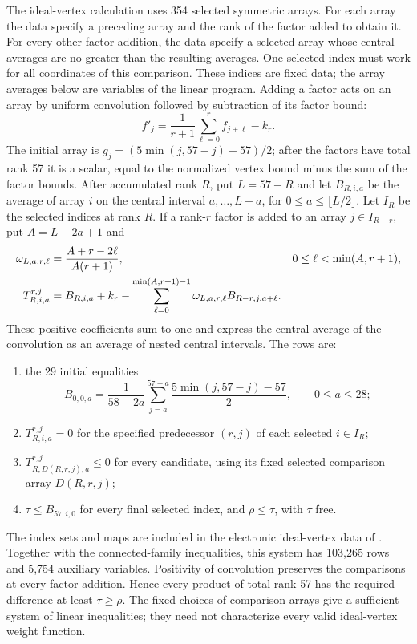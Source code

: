 \documentclass[11pt]{article}
\theoremstyle{definition}
\theoremstyle{remark}
\numberwithin{equation}{section}
\begin{document}
The ideal-vertex calculation uses 354 selected symmetric arrays. For
each array the data specify a preceding array and the rank of the
factor added to obtain it. For every other factor addition, the data
specify a selected array whose central averages are no greater than
the resulting averages. One selected index must work for all
coordinates of this comparison. These indices are fixed data; the
array averages below are variables of the linear program. Adding a
factor acts on an array by uniform convolution followed by subtraction
of its factor bound:
\[
 f'_j=\frac1{r+1}\sum_{\ell=0}^r f_{j+\ell}-k_r.
\]
The initial array is $g_j=(5\min(j,57-j)-57)/2$; after the factors
have total rank 57 it is a scalar, equal to the normalized vertex
bound minus the sum of the factor bounds. After accumulated rank
$R$, put $L=57-R$ and let $B_{R,i,a}$ be the average of array $i$
on the central interval $a,\ldots,L-a$, for
$0\le a\le\lfloor L/2\rfloor$. Let $I_R$ be the selected indices
at rank $R$. If a rank-$r$ factor is added to an array
$j\in I_{R-r}$, put $A=L-2a+1$ and
\begin{align}
 \omega_{L,a,r,\ell}&=\frac{A+r-2\ell}{A(r+1)},
       &&0\le\ell<\min(A,r+1),\notag\\
 T_{R,i,a}^{r,j}&=B_{R,i,a}+k_r-
       \sum_{\ell=0}^{\min(A,r+1)-1}
           \omega_{L,a,r,\ell}B_{R-r,j,a+\ell}.
       \label{fv:ideal-average-transform}
\end{align}
These positive coefficients sum to one and express the central average
of the convolution as an average of nested central intervals. The rows
are:
\begin{enumerate}[label=\textup{(\roman*)},nosep]
\item the 29 initial equalities
\[
 B_{0,0,a}=\frac1{58-2a}\sum_{j=a}^{57-a}
                  \frac{5\min(j,57-j)-57}{2},
 \qquad0\le a\le28;
\]
\item $T_{R,i,a}^{r,j}=0$ for the specified predecessor $(r,j)$ of
 each selected $i\in I_R$;
\item $T_{R,D(R,r,j),a}^{r,j}\le0$ for every candidate, using
 its fixed selected comparison array $D(R,r,j)$;
\item $\tau\le B_{57,i,0}$ for every final selected index, and
 $\rho\le\tau$, with $\tau$ free.
\end{enumerate}
The index sets and maps are included in the electronic ideal-vertex
data of \cite{LPRepository}. Together with the connected-family
inequalities, this system has 103,265 rows and 5,754 auxiliary
variables. Positivity of convolution preserves the comparisons at
every factor addition. Hence every product of total rank 57 has the
required difference at least $\tau\ge\rho$. The fixed choices of
comparison arrays give a sufficient system of linear inequalities;
they need not characterize every valid ideal-vertex weight function.
\end{document}
